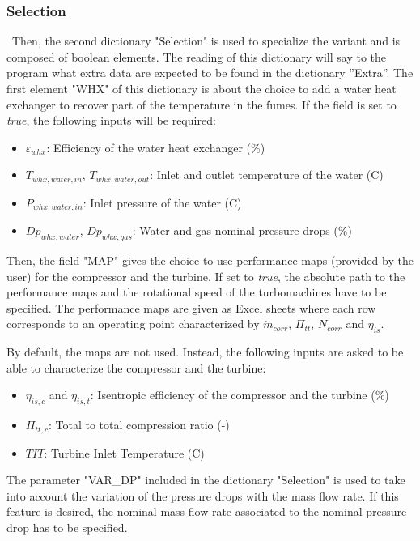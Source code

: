 \subsubsection{Selection}
\quad\ Then, the second dictionary "Selection" is used to specialize the variant and is composed of boolean elements. The reading of this dictionary will say to the program what extra data are expected to be found in the dictionary ''Extra''.
\newpage
The first element "WHX" of this dictionary is about the choice to add a water heat exchanger to recover part of the temperature in the fumes. If the field is set to \textit{true}, the following inputs will be required:
\begin{itemize}
    \item $\varepsilon_{whx}$: Efficiency of the water heat exchanger (\%)
    \item $T_{whx,water,in}$, $T_{whx,water,out}$: Inlet and outlet temperature of the water (\degree C)
    \item $P_{whx,water, in}$: Inlet pressure of the water (\degree C)
    \item $Dp_{whx,water}$, $Dp_{whx,gas}$: Water and gas nominal pressure drops (\%)
\end{itemize}

Then, the field "MAP" gives the choice to use performance maps (provided by the user) for the compressor and the turbine. If set to \textit{true}, the absolute path to the performance maps and the rotational speed of the turbomachines have to be specified. The performance maps are given as Excel sheets where each row corresponds to an operating point characterized by \(\dot{m}_{corr}\), \(\Pi_{tt}\), \(N_{corr}\) and \(\eta_{is}\).

By default, the maps are not used. Instead, the following inputs are asked to be able to characterize the compressor and the turbine:

\begin{itemize}
    \item $\eta_{is,c}$ and $\eta_{is,t}$: Isentropic efficiency of the compressor and the turbine (\%)
    \item $\Pi_{tt,c}$: Total to total compression ratio (-)
    \item $TIT$: Turbine Inlet Temperature (\degree C)
\end{itemize}

The parameter "VAR\_DP" included in the dictionary "Selection" is used to take into account the variation of the pressure drops with the mass flow rate. If this feature is desired, the nominal mass flow rate associated to the nominal pressure drop has to be specified.  

